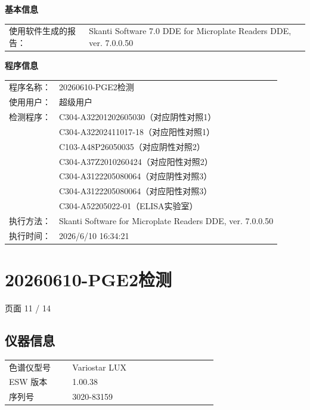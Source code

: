 \documentclass[UTF8,10pt,a4paper,fontset=fandol]{ctexart}
\newcommand{\fieldvalue}[1]{#1}
\begin{document}
\vspace{0.8em}

\noindent\textbf{基本信息}

\begin{tabular}{@{}ll@{}}
使用软件生成的报告：&
Skanti Software 7.0 DDE for Microplate Readers DDE, ver. 7.0.0.50 \\
\end{tabular}

\vspace{0.5em}

\noindent\textbf{程序信息}

\begin{tabular}{@{}ll@{}}
程序名称：&20260610-PGE2检测 \\
使用用户：&超级用户 \\
检测程序：&C304-A32201202605030（对应阴性对照1） \\
& C304-A32202411017-18（对应阳性对照1） \\
& C103-A48P26050035（对应阴性对照2） \\
& C304-A37Z2010260424（对应阳性对照2） \\
& C304-A3122205080064（对应阴性对照3） \\
& C304-A3122205080064（对应阳性对照3） \\
& C304-A52205022-01（ELISA实验室） \\
执行方法：&Skanti Software for Microplate Readers DDE, ver. 7.0.0.50 \\
执行时间：&2026/6/10 16:34:21 \\
\end{tabular}


\newpage

\section*{20260610-PGE2检测}

\begin{flushright}
页面 11 / 14
\end{flushright}

\subsection*{仪器信息}

\begin{tabular}{@{}p{0.24\linewidth}p{0.55\linewidth}@{}}
色谱仪型号 &
\fieldvalue{Variostar LUX}
\\
ESW 版本 &
\fieldvalue{1.00.38}
\\
序列号 &
\fieldvalue{3020-83159}
\\
\end{tabular}
\end{document}
